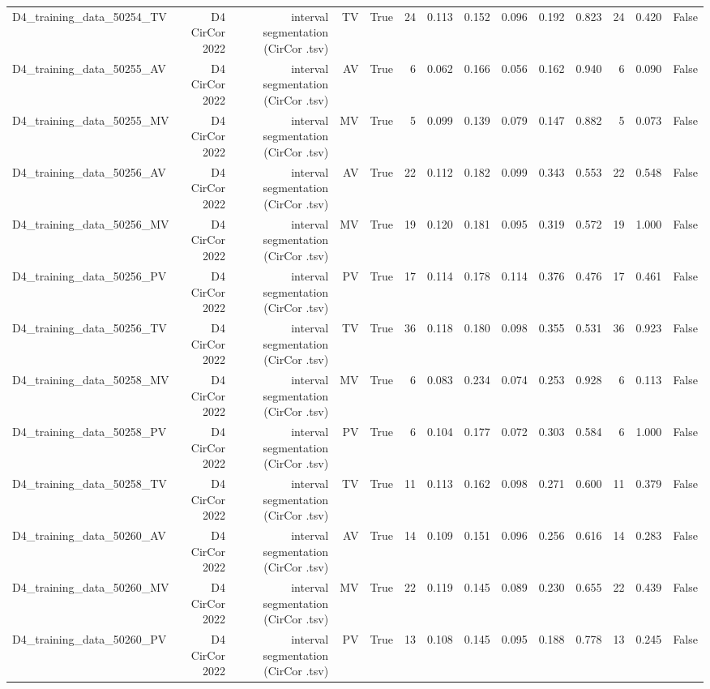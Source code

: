 \begin{table}[htbp]
\begin{tabular}{lrrrrrrrrrrrrr}
    D4\_training\_data\_50254\_TV & D4 CirCor 2022 & interval segmentation (CirCor .tsv) & TV & True & 24 & 0.113 & 0.152 & 0.096 & 0.192 & 0.823 & 24 & 0.420 & False \\
    D4\_training\_data\_50255\_AV & D4 CirCor 2022 & interval segmentation (CirCor .tsv) & AV & True & 6 & 0.062 & 0.166 & 0.056 & 0.162 & 0.940 & 6 & 0.090 & False \\
    D4\_training\_data\_50255\_MV & D4 CirCor 2022 & interval segmentation (CirCor .tsv) & MV & True & 5 & 0.099 & 0.139 & 0.079 & 0.147 & 0.882 & 5 & 0.073 & False \\
    D4\_training\_data\_50256\_AV & D4 CirCor 2022 & interval segmentation (CirCor .tsv) & AV & True & 22 & 0.112 & 0.182 & 0.099 & 0.343 & 0.553 & 22 & 0.548 & False \\
    D4\_training\_data\_50256\_MV & D4 CirCor 2022 & interval segmentation (CirCor .tsv) & MV & True & 19 & 0.120 & 0.181 & 0.095 & 0.319 & 0.572 & 19 & 1.000 & False \\
    D4\_training\_data\_50256\_PV & D4 CirCor 2022 & interval segmentation (CirCor .tsv) & PV & True & 17 & 0.114 & 0.178 & 0.114 & 0.376 & 0.476 & 17 & 0.461 & False \\
    D4\_training\_data\_50256\_TV & D4 CirCor 2022 & interval segmentation (CirCor .tsv) & TV & True & 36 & 0.118 & 0.180 & 0.098 & 0.355 & 0.531 & 36 & 0.923 & False \\
    D4\_training\_data\_50258\_MV & D4 CirCor 2022 & interval segmentation (CirCor .tsv) & MV & True & 6 & 0.083 & 0.234 & 0.074 & 0.253 & 0.928 & 6 & 0.113 & False \\
    D4\_training\_data\_50258\_PV & D4 CirCor 2022 & interval segmentation (CirCor .tsv) & PV & True & 6 & 0.104 & 0.177 & 0.072 & 0.303 & 0.584 & 6 & 1.000 & False \\
    D4\_training\_data\_50258\_TV & D4 CirCor 2022 & interval segmentation (CirCor .tsv) & TV & True & 11 & 0.113 & 0.162 & 0.098 & 0.271 & 0.600 & 11 & 0.379 & False \\
    D4\_training\_data\_50260\_AV & D4 CirCor 2022 & interval segmentation (CirCor .tsv) & AV & True & 14 & 0.109 & 0.151 & 0.096 & 0.256 & 0.616 & 14 & 0.283 & False \\
    D4\_training\_data\_50260\_MV & D4 CirCor 2022 & interval segmentation (CirCor .tsv) & MV & True & 22 & 0.119 & 0.145 & 0.089 & 0.230 & 0.655 & 22 & 0.439 & False \\
    D4\_training\_data\_50260\_PV & D4 CirCor 2022 & interval segmentation (CirCor .tsv) & PV & True & 13 & 0.108 & 0.145 & 0.095 & 0.188 & 0.778 & 13 & 0.245 & False \\

\end{tabular}
\end{table}
